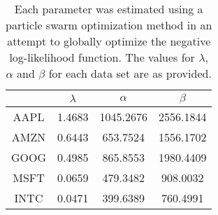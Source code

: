 \begin{table}[htpb]

\centering
\begin{tabular}{c|c|c|c}
     &  $\lambda$ & $\alpha$ & $\beta$\\
\hline
AAPL & 1.4683 & 1045.2676 & 2556.1844\\
AMZN & 0.6443 & 653.7524 & 1556.1702\\
GOOG & 0.4985 & 865.8553 & 1980.4409\\
MSFT & 0.0659 &479.3482 & 908.0032\\
INTC & 0.0471 & 399.6389 & 760.4991
\end{tabular}

\caption{\label{table:params} Each parameter was estimated using a particle swarm optimization method in an attempt to globally optimize the negative log-likelihood function. The values for $\lambda$, $\alpha$ and $\beta$ for each data set are as provided.}
\end{table}